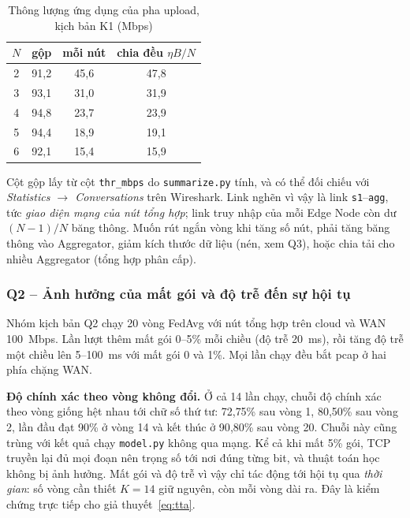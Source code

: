 \begin{table}[H]
    \centering
    \caption{Thông lượng ứng dụng của pha upload, kịch bản K1 (Mbps)}
    \label{tab:q1thr}
    \begin{tabular}{c c c c}
        \toprule
        $N$ & \textbf{gộp} & \textbf{mỗi nút} & \textbf{chia đều $\eta B / N$} \\
        \midrule
        2 & 91,2 & 45,6 & 47,8 \\
        3 & 93,1 & 31,0 & 31,9 \\
        4 & 94,8 & 23,7 & 23,9 \\
        5 & 94,4 & 18,9 & 19,1 \\
        6 & 92,1 & 15,4 & 15,9 \\
        \bottomrule
    \end{tabular}
\end{table}

Cột gộp lấy từ cột \texttt{thr\_mbps} do \texttt{summarize.py} tính, và có thể đối chiếu với \emph{Statistics $\rightarrow$ Conversations} trên Wireshark. Link nghẽn vì vậy là link \texttt{s1}--\texttt{agg}, tức \emph{giao diện mạng của nút tổng hợp}; link truy nhập của mỗi Edge Node còn dư $(N-1)/N$ băng thông. Muốn rút ngắn vòng khi tăng số nút, phải tăng băng thông vào Aggregator, giảm kích thước dữ liệu (nén, xem Q3), hoặc chia tải cho nhiều Aggregator (tổng hợp phân cấp).

\subsubsection{Q2 -- Ảnh hưởng của mất gói và độ trễ đến sự hội tụ}
Nhóm kịch bản Q2 chạy 20 vòng FedAvg với nút tổng hợp trên cloud và WAN 100~Mbps. Lần lượt thêm mất gói 0--5\% mỗi chiều (độ trễ 20~ms), rồi tăng độ trễ một chiều lên 5--100~ms với mất gói 0 và 1\%. Mọi lần chạy đều bắt pcap ở hai phía chặng WAN.

\textbf{Độ chính xác theo vòng không đổi.} Ở cả 14 lần chạy, chuỗi độ chính xác theo vòng giống hệt nhau tới chữ số thứ tư: 72{,}75\% sau vòng 1, 80{,}50\% sau vòng 2, lần đầu đạt 90\% ở vòng 14 và kết thúc ở 90{,}80\% sau vòng 20. Chuỗi này cũng trùng với kết quả chạy \texttt{model.py} không qua mạng. Kể cả khi mất 5\% gói, TCP truyền lại đủ mọi đoạn nên trọng số tới nơi đúng từng bit, và thuật toán học không bị ảnh hưởng. Mất gói và độ trễ vì vậy chỉ tác động tới hội tụ qua \emph{thời gian}: số vòng cần thiết $K = 14$ giữ nguyên, còn mỗi vòng dài ra. Đây là kiểm chứng trực tiếp cho giả thuyết~\eqref{eq:tta}.


